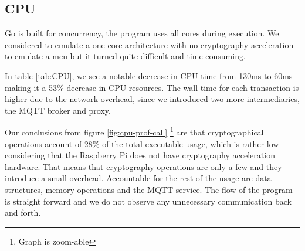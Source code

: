 \subsection{CPU}
Go is built for concurrency, the program uses all cores during execution. We considered to emulate a one-core architecture with no cryptography acceleration to emulate a \acrfull{mcu} but it turned quite difficult and time consuming.

In table \ref{tab:CPU}, we see a notable decrease in CPU time from 130ms to 60ms making it a 53\% decrease in CPU resources. The wall time for each transaction is higher due to the network overhead, since we introduced two more intermediaries, the MQTT broker and proxy.


Our conclusions from figure \ref{fig:cpu-prof-call} \footnote{Graph is zoom-able} are that cryptographical operations account of 28\% of the total executable usage, which is rather low considering that the Raspberry Pi does not have cryptography acceleration hardware. That means that cryptography operations are only a few and they introduce a small overhead. Accountable for the rest of the usage are data structures, memory operations and the MQTT service. The flow of the program is straight forward and we do not observe any unnecessary communication back and forth. 

